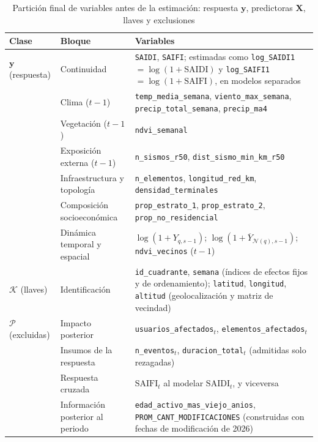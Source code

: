\begin{table}[!htbp]
\centering
\footnotesize
\setlength{\tabcolsep}{4pt}
\caption{Partición final de variables antes de la estimación: respuesta $\mathbf{y}$, predictoras $\mathbf{X}$, llaves y exclusiones}
\label{tab:particion_variables_modelado}
\begin{tabular}{@{}>{\raggedright\arraybackslash}p{2.3cm} >{\raggedright\arraybackslash}p{2.6cm} >{\raggedright\arraybackslash}p{7.4cm}@{}}
\toprule
\textbf{Clase} & \textbf{Bloque} & \textbf{Variables} \\
\midrule
$\mathbf{y}$ (respuesta) & Continuidad &
\texttt{SAIDI}, \texttt{SAIFI}; estimadas como \texttt{log\_SAIDI1} $=\log(1+\mathrm{SAIDI})$ y \texttt{log\_SAIFI1} $=\log(1+\mathrm{SAIFI})$, en modelos separados \\
\addlinespace
\multirow{6}{2.3cm}{$\mathbf{X}$ (predictoras)} & Clima ($t-1$) &
\texttt{temp\_media\_semana}, \texttt{viento\_max\_semana}, \texttt{precip\_total\_semana}, \texttt{precip\_ma4} \\
& Vegetación ($t-1$) &
\texttt{ndvi\_semanal} \\
& Exposición externa ($t-1$) &
\texttt{n\_sismos\_r50}, \texttt{dist\_sismo\_min\_km\_r50} \\
& Infraestructura y topología &
\texttt{n\_elementos}, \texttt{longitud\_red\_km}, \texttt{densidad\_terminales} \\
& Composición socio\-económica &
\texttt{prop\_estrato\_1}, \texttt{prop\_estrato\_2}, \texttt{prop\_no\_residencial} \\
& Dinámica temporal y espacial &
$\log(1+Y_{q,s-1})$; $\log(1+\overline{Y}_{\mathcal{N}(q),s-1})$; \texttt{ndvi\_vecinos} ($t-1$) \\
\addlinespace
$\mathcal{K}$ (llaves) & Identificación &
\texttt{id\_cuadrante}, \texttt{semana} (índices de efectos fijos y de ordenamiento); \texttt{latitud}, \texttt{longitud}, \texttt{altitud} (geolocalización y matriz de vecindad) \\
\addlinespace
$\mathcal{P}$ (excluidas) & Impacto posterior &
\texttt{usuarios\_afectados}$_t$, \texttt{elementos\_afectados}$_t$ \\
& Insumos de la respuesta &
\texttt{n\_eventos}$_t$, \texttt{duracion\_total}$_t$ (admitidas solo rezagadas) \\
& Respuesta cruzada &
$\mathrm{SAIFI}_t$ al modelar $\mathrm{SAIDI}_t$, y viceversa \\
& Información posterior al periodo &
\texttt{edad\_activo\_mas\_viejo\_anios}, \texttt{PROM\_CANT\_MODIFICACIONES} (construidas con fechas de modificación de 2026) \\
\bottomrule
\end{tabular}


\end{table}
